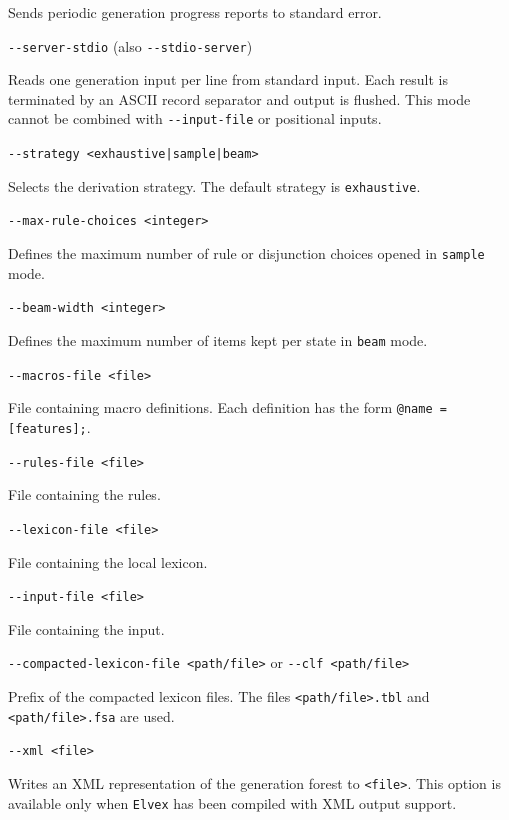 \documentclass[11pt]{article}
\begin{document}
\begin{description}
	      Sends periodic generation progress reports to standard error.

	\item \verb#--server-stdio# (also \verb#--stdio-server#)

	      Reads one generation input per line from standard input. Each result
	      is terminated by an ASCII record separator and output is flushed.
	      This mode cannot be combined with \verb#--input-file# or positional inputs.

	\item \verb#--strategy <exhaustive|sample|beam>#

	      Selects the derivation strategy. The default strategy is \verb#exhaustive#.

	\item \verb#--max-rule-choices <integer>#

	      Defines the maximum number of rule or disjunction choices opened in
	      \verb#sample# mode.

	\item \verb#--beam-width <integer>#

	      Defines the maximum number of items kept per state in \verb#beam# mode.

	\item \verb#--macros-file <file>#

	      File containing macro definitions.  Each definition has the form
		      \verb#@name = [features];#.

	\item \verb#--rules-file <file>#

	      File containing the rules.

	\item \verb#--lexicon-file <file>#

	      File containing the local lexicon.

	\item \verb#--input-file <file>#

	      File containing the input.

	\item \verb#--compacted-lexicon-file <path/file># or \verb#--clf <path/file>#

	      Prefix of the compacted lexicon files. The files
	      \verb#<path/file>.tbl# and \verb#<path/file>.fsa# are used.

	\item \verb#--xml <file>#

	      Writes an XML representation of the generation forest to
	      \verb#<file>#. This option is available only when \texttt{Elvex}
	      has been compiled with XML output support.


\end{description}
\end{document}
